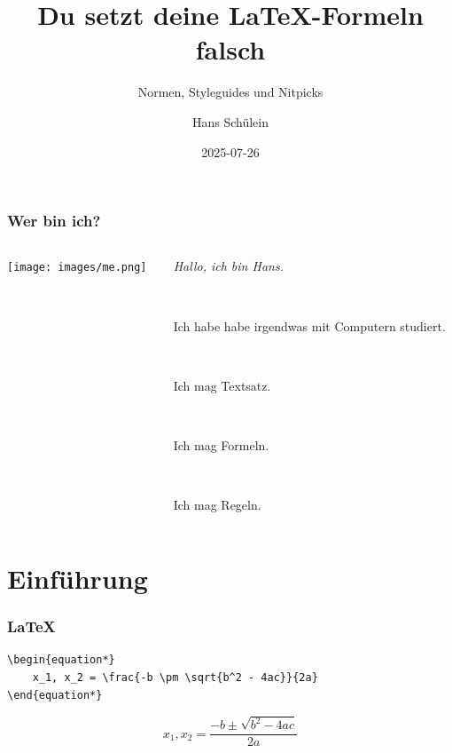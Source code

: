 \documentclass[aspectratio=169, 10pt]{beamer}
\begin{document}
\title{Du setzt deine \LaTeX-Formeln falsch}
\subtitle{Normen, Styleguides und Nitpicks}
\author{Hans Schülein}
\date{2025-07-26}

\begin{frame}[fragile]
    \titlepage
\end{frame}

\begin{frame}[fragile]
    \frametitle{Wer bin ich?}
    \begin{columns}
        \begin{column}{0.33\textwidth}
            \texttt{[image: images/me.png]}
        \end{column}
        \begin{column}{0.67\textwidth}
            \textit{Hallo, ich bin Hans.}

            ~

            Ich habe habe irgendwas mit Computern studiert.

            ~

            Ich mag Textsatz.

            ~

            Ich mag Formeln.

            ~

            Ich mag Regeln.
        \end{column}
    \end{columns}
\end{frame}

\section{Einführung}

\begin{frame}[fragile]
    \frametitle{\LaTeX}
    \begin{lstlisting}
\begin{equation*}
    x_1, x_2 = \frac{-b \pm \sqrt{b^2 - 4ac}}{2a}
\end{equation*}
    \end{lstlisting}

    \begin{equation*}
        x_1, x_2 = \frac{-b \pm \sqrt{b^2 - 4ac}}{2a}
    \end{equation*}
\end{frame}
\end{document}
